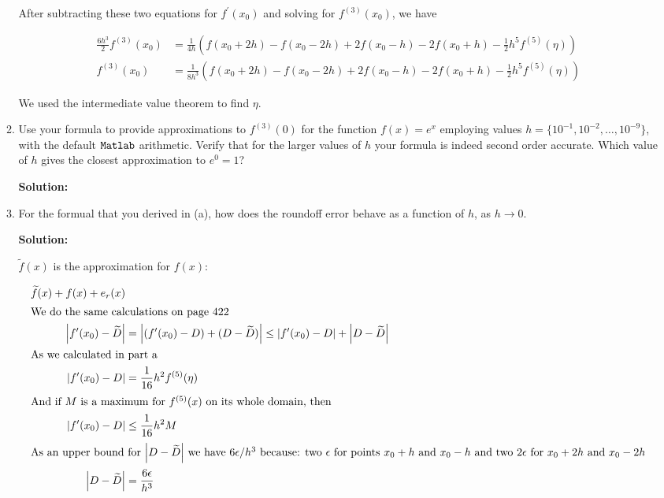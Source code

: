 \documentclass[12pt]{article}
\newcommand{\abs}[1]{\left| #1 \right|}
\begin{document}
\begin{enumerate}
\begin{enumerate}
After subtracting these two equations for $f^{\prime}(x_{0})$ and solving for $f^{(3)}(x_{0})$, we have

\begin{align*}
\frac{6h^{3}}{2}f^{(3)}(x_{0}) &= \frac{1}{4h}\left( f(x_{0} + 2h) - f(x_{0} - 2h) + 2f(x_{0} - h) - 2f(x_{0} + h) - \frac{1}{2}h^{5}f^{(5)}(\eta)\right)\\
f^{(3)}(x_{0}) &=\frac{1}{8h^{3}}\left( f(x_{0} + 2h) - f(x_{0} - 2h) + 2f(x_{0} - h) - 2f(x_{0} + h) - \frac{1}{2}h^{5}f^{(5)}(\eta)\right)
\end{align*}

We used the intermediate value theorem to find $\eta$. 

\item Use your formula to provide approximations to $f^{(3)}(0)$ for the function $f(x) = e^{x}$ employing values $h = \{ 10^{-1}, 10^{-2}, \ldots, 10^{-9}\}$, with the default ${\tt Matlab}$ arithmetic. Verify that for the larger values of $h$ your formula is indeed second order accurate. Which value of $h$ gives the closest approximation to $e^{0} = 1$?

{\bf Solution:}

\item For the formual that you derived in (a), how does the roundoff error behave as a function of $h$, as $h\rightarrow 0$.

{\bf Solution:}

$\widetilde{f}(x)$ is the approximation for $f(x)$:

\begin{align*}
\widetilde{f}(x) + f(x) + e_{r}(x)\\
\intertext{We do the same calculations on page 422}
\abs{f^{\prime}(x_{0}) - \widetilde{D}} &= \abs{ (f^{\prime}(x_{0}) - D) + (D - \widetilde{D})} \leq \abs{ f^{\prime}(x_{0}) - D} + \abs{D - \widetilde{D}}\\
\intertext{As we calculated in part a}
\abs{f^{\prime}(x_{0}) - D} &= \frac{1}{16}h^{2}f^{(5)}(\eta)\\
\intertext{And if $M$ is a maximum for $f^{(5)}(x)$ on its whole domain, then}
\abs{f^{\prime}(x_{0}) - D} &\leq \frac{1}{16}h^{2}M\\
\intertext{As an upper bound for $\abs{D - \widetilde{D}}$ we have $6\epsilon/h^{3}$ because: two $\epsilon$ for points $x_{0} + h$ and $x_{0} - h$ and two $2\epsilon$ for $x_{0} + 2h$ and $x_{0} - 2h$}
\abs{D - \widetilde{D}} &= \frac{6\epsilon}{h^{3}}\\
\end{align*}


\end{enumerate}
\end{enumerate}
\end{document}
